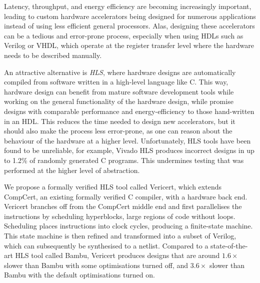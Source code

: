 
Latency, throughput, and energy efficiency are becoming increasingly important,
leading to custom hardware accelerators being designed for numerous applications
instead of using less efficient general processors.  Alas, designing these
accelerators can be a tedious and error-prone process, especially when using
\glspl{HDL} such as Verilog or VHDL, which operate at the register transfer
level where the hardware needs to be described manually.

An attractive alternative is \emph{\gls{HLS}}, where hardware designs are
automatically compiled from software written in a high-level language like C.
This way, hardware design can benefit from mature software development tools
while working on the general functionality of the hardware design, while promise
designs with comparable performance and energy-efficiency to those hand-written
in an \gls{HDL}.  This reduces the time needed to design new accelerators, but
it should also make the process less error-prone, as one can reason about the
behaviour of the hardware at a higher level.  Unfortunately, \gls{HLS} tools
have been found to be unreliable, for example, Vivado HLS produces incorrect
designs in up to 1.2\% of randomly generated C programs.  This undermines
testing that was performed at the higher level of abstraction.

We propose a formally verified \gls{HLS} tool called Vericert, which extends
CompCert, an existing formally verified C compiler, with a hardware back end.
Vericert branches off from the CompCert middle end and first parallelises the
instructions by scheduling hyperblocks, large regions of code without loops.
Scheduling places instructions into clock cycles, producing a finite-state
machine.  This state machine is then refined and transformed into a subset of
Verilog, which can subsequently be synthesised to a netlist.  Compared to a
state-of-the-art \gls{HLS} tool called Bambu, Vericert produces designs that are
around $1.6\times$ slower than Bambu with some optimisations turned off, and
$3.6\times$ slower than Bambu with the default optimisations turned on.

